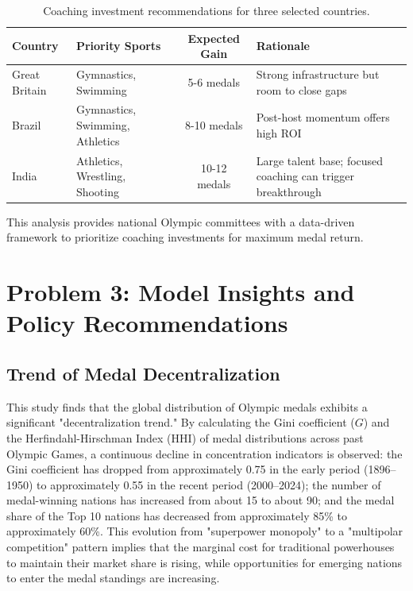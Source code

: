 \documentclass{mcmthesis}
\begin{document}
\begin{table}[H]
    \centering
    \caption{Coaching investment recommendations for three selected countries.}
    \label{tab:recommendations}
    \small
    \begin{tabularx}{\textwidth}{l>{\raggedright}Xc>{\raggedright\arraybackslash}X}
        \toprule
        \textbf{Country} & \textbf{Priority Sports} & \textbf{Expected Gain} & \textbf{Rationale} \\
        \midrule
        Great Britain & Gymnastics, Swimming & 5-6 medals & Strong infrastructure but room to close gaps \\
        Brazil & Gymnastics, Swimming, Athletics & 8-10 medals & Post-host momentum offers high ROI \\
        India & Athletics, Wrestling, Shooting & 10-12 medals & Large talent base; focused coaching can trigger breakthrough \\
        \bottomrule
    \end{tabularx}
\end{table}

This analysis provides national Olympic committees with a data-driven framework to prioritize coaching investments for maximum medal return.
\section{Problem 3: Model Insights and Policy Recommendations}
\subsection{Trend of Medal Decentralization}

This study finds that the global distribution of Olympic medals exhibits a significant "decentralization trend." By calculating the Gini coefficient ($G$) and the Herfindahl-Hirschman Index (HHI) of medal distributions across past Olympic Games, a continuous decline in concentration indicators is observed: the Gini coefficient has dropped from approximately 0.75 in the early period (1896--1950) to approximately 0.55 in the recent period (2000--2024); the number of medal-winning nations has increased from about 15 to about 90; and the medal share of the Top 10 nations has decreased from approximately 85\% to approximately 60\%. This evolution from "superpower monopoly" to a "multipolar competition" pattern implies that the marginal cost for traditional powerhouses to maintain their market share is rising, while opportunities for emerging nations to enter the medal standings are increasing.
\end{document}

